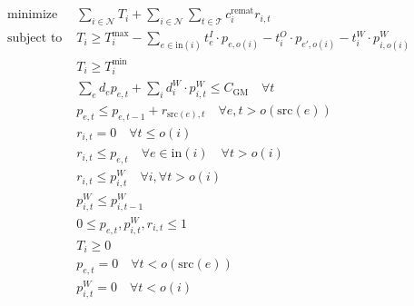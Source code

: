 \documentclass{article}
\begin{document}
\newpage
\begin{equation*}
\begin{aligned}
\text{minimize} & \sum_{i\in \mathcal N} T_i+\sum_{i\in\mathcal N}\sum_{t\in\mathcal T} c_{i}^{\text{remat}} r_{i,t}\\
\text{subject to } & T_i\geq T_i^{\text{max}}-\sum_{e\in\text{in}(i)}t_e^I\cdot p_{e,o(i)}-t_i^O\cdot p_{e',o(i)}-t_i^W\cdot p_{i,o(i)}^W\\
& T_i\geq T_i^{\text{min}}\\
& \sum_e d_e p_{e,t}+\sum_i d_i^W\cdot p_{i,t}^W \leq C_{\text{GM}} \quad \forall t\\
& p_{e,t}\leq p_{e,t-1}+r_{\text{src}(e),t}\quad \forall e,t>o(\text{src}(e))\\
& r_{i,t}=0\quad \forall t\leq o(i)\\
& r_{i,t} \leq p_{e,t} \quad \forall e\in\text{in}(i)\quad \forall t>o(i)\\
&r_{i,t}\leq p_{i,t}^W\quad \forall i,\forall t>o(i)\\
& p_{i,t}^W\leq p_{i,t-1}^W\\
& 0\leq  p_{e,t}, p^W_{i,t}, r_{i,t}\leq 1\\
& T_i\geq 0 \\
& p_{e,t} = 0 \quad \forall t<o(\text{src}(e)) \\
& p_{i,t}^W=0 \quad \forall t<o(i)
\end{aligned}
\end{equation*}
\end{document}
